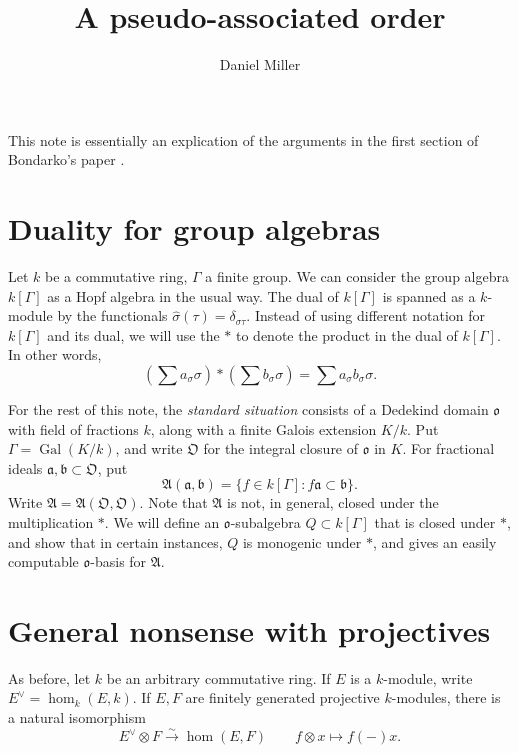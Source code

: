 \documentclass{article}
\title{A pseudo-associated order}
\author{Daniel Miller}
\DeclareMathOperator{\gal}{Gal}
\newcommand{\fa}{\mathfrak{a}}
\newcommand{\fA}{\mathfrak{A}}
\newcommand{\fb}{\mathfrak{b}}
\newcommand{\fo}{\mathfrak{o}}
\newcommand{\fO}{\mathfrak{O}}
\newcommand{\iso}{\xrightarrow\sim}
\begin{document}
\maketitle





This note is essentially an explication of the arguments in the first section 
of Bondarko's paper \cite{bondarko-2000}. 





\section{Duality for group algebras}

Let $k$ be a commutative ring, $\Gamma$ a finite group. We can consider the 
group algebra $k[\Gamma]$ as a Hopf algebra in the usual way. The dual of 
$k[\Gamma]$ is spanned as a $k$-module by the functionals 
$\hat\sigma(\tau)=\delta_{\sigma\tau}$. Instead of using different notation for 
$k[\Gamma]$ and its dual, we will use the $\ast$ to denote the product in the 
dual of $k[\Gamma]$. In other words, 
\[
  \left(\sum a_\sigma \sigma\right) \ast \left(\sum b_\sigma \sigma\right) = \sum a_\sigma b_\sigma \sigma .
\]

For the rest of this note, the \emph{standard situation} consists of a 
Dedekind domain $\fo$ with field of fractions $k$, along with a finite Galois 
extension $K/k$. Put $\Gamma=\gal(K/k)$, and write $\fO$ for the integral 
closure of $\fo$ in $K$. For fractional ideals $\fa,\fb\subset\fO$, put 
\[
  \fA(\fa,\fb)=\{f\in k[\Gamma]:f\fa\subset \fb\} .
\]
Write $\fA=\fA(\fO,\fO)$. Note that $\fA$ is not, in general, closed under the 
multiplication $\ast$. We will define an $\fo$-subalgebra 
$Q\subset k[\Gamma]$ that is closed under $\ast$, and show that in certain 
instances, $Q$ is monogenic under $\ast$, and gives an easily computable 
$\fo$-basis for $\fA$. 





\section{General nonsense with projectives}

As before, let $k$ be an arbitrary commutative ring. If $E$ is a $k$-module, 
write $E^\vee=\hom_k(E,k)$. If $E,F$ are finitely generated projective 
$k$-modules, there is a natural isomorphism 
\[
  E^\vee\otimes F\iso \hom(E,F) \qquad f\otimes x\mapsto f(-) x .
\]
\end{document}
